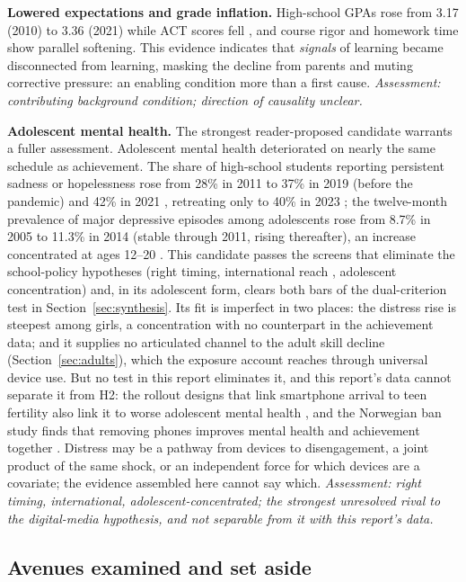 \documentclass[11pt]{article}
\begin{document}
\textbf{Lowered expectations and grade inflation.} High-school GPAs rose from 3.17 (2010) to 3.36 (2021) while ACT scores fell \citep{act2022}, and course rigor and homework time show parallel softening. This evidence indicates that \emph{signals} of learning became disconnected from learning, masking the decline from parents and muting corrective pressure: an enabling condition more than a first cause. \emph{Assessment: contributing background condition; direction of causality unclear.}

\textbf{Adolescent mental health.} The strongest reader-proposed candidate warrants a fuller assessment. Adolescent mental health deteriorated on nearly the same schedule as achievement. The share of high-school students reporting persistent sadness or hopelessness rose from 28\% in 2011 to 37\% in 2019 (before the pandemic) and 42\% in 2021 \citep{cdcyrbs2023}, retreating only to 40\% in 2023 \citep{cdcyrbs2024}; the twelve-month prevalence of major depressive episodes among adolescents rose from 8.7\% in 2005 to 11.3\% in 2014 (stable through 2011, rising thereafter), an increase concentrated at ages 12--20 \citep{mojtabai2016}. This candidate passes the screens that eliminate the school-policy hypotheses (right timing, international reach \citep{haidt2024}, adolescent concentration) and, in its adolescent form, clears both bars of the dual-criterion test in Section~\ref{sec:synthesis}. Its fit is imperfect in two places: the distress rise is steepest among girls, a concentration with no counterpart in the achievement data; and it supplies no articulated channel to the adult skill decline (Section~\ref{sec:adults}), which the exposure account reaches through universal device use. But no test in this report eliminates it, and this report's data cannot separate it from H2: the rollout designs that link smartphone arrival to teen fertility also link it to worse adolescent mental health \citep{hudsonmoscoso2026}, and the Norwegian ban study finds that removing phones improves mental health and achievement together \citep{abrahamsson2024}. Distress may be a pathway from devices to disengagement, a joint product of the same shock, or an independent force for which devices are a covariate; the evidence assembled here cannot say which. \emph{Assessment: right timing, international, adolescent-concentrated; the strongest unresolved rival to the digital-media hypothesis, and not separable from it with this report's data.}

\subsection{Avenues examined and set aside}
\label{sec:setaside}
\end{document}
